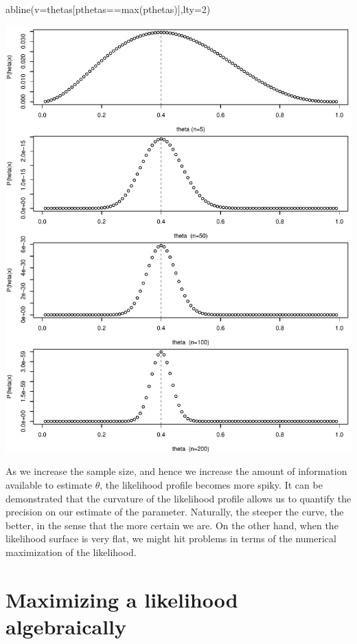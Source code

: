 \documentclass[
]{book}
\newenvironment{Shaded}{\begin{snugshade}}{\end{snugshade}}
\newcommand{\AttributeTok}[1]{\textcolor[rgb]{0.77,0.63,0.00}{#1}}
\newcommand{\DecValTok}[1]{\textcolor[rgb]{0.00,0.00,0.81}{#1}}
\newcommand{\FunctionTok}[1]{\textcolor[rgb]{0.00,0.00,0.00}{#1}}
\newcommand{\NormalTok}[1]{#1}
\newcommand{\SpecialCharTok}[1]{\textcolor[rgb]{0.00,0.00,0.00}{#1}}
\begin{document}
\begin{Shaded}
\begin{Highlighting}[]
\FunctionTok{abline}\NormalTok{(}\AttributeTok{v=}\NormalTok{thetas[pthetas}\SpecialCharTok{==}\FunctionTok{max}\NormalTok{(pthetas)],}\AttributeTok{lty=}\DecValTok{2}\NormalTok{)}
\end{Highlighting}
\end{Shaded}

\includegraphics{ECOMODbook_files/figure-latex/ch13.4-1.pdf}

As we increase the sample size, and hence we increase the amount of information available to estimate \(\theta\), the likelihood profile becomes more spiky. It can be demonstrated that the curvature of the likelihood profile allows us to quantify the precision on our estimate of the parameter. Naturally, the steeper the curve, the better, in the sense that the more certain we are. On the other hand, when the likelihood surface is very flat, we might hit problems in terms of the numerical maximization of the likelihood.

\hypertarget{maximizing-a-likelihood-algebraically}{%
\section{Maximizing a likelihood algebraically}\label{maximizing-a-likelihood-algebraically}}
\end{document}
